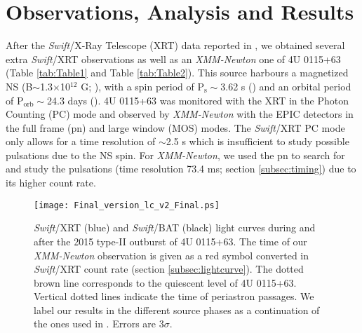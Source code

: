 \documentclass[a4paper,fleqn,usenatbib]{mnras}
\begin{document}
\section{Observations, Analysis and Results}\label{sec:analysis}
After the \textit{Swift}/X-Ray Telescope (XRT) data reported in \cite{Wijnands2016}, we obtained several extra \textit{Swift}/XRT observations as well as an \textit{XMM-Newton} one of 4U 0115+63 (Table \ref{tab:Table1} and Table \ref{tab:Table2}). This source harbours a magnetized NS (B$\sim$1.3$\times$10$^{12}$ G; \citealt{Raguzova2005}), with a spin period of P$_\mathrm{s}\sim$3.62 s (\citealt{Cominsky1978}) and an orbital period of P$_\mathrm{orb}\sim$24.3 days (\citealt{Rappaport1978}). 4U 0115+63 was monitored with the XRT in the Photon Counting (PC) mode and observed by \textit{XMM-Newton} with the EPIC detectors in the full frame (pn) and large window (MOS) modes. The \textit{Swift}/XRT PC mode only allows for a time resolution of $\sim$2.5 s which is insufficient to study possible pulsations due to the NS spin. For \textit{XMM-Newton}, we used the pn to search for and study the pulsations (time resolution 73.4 ms; section \ref{subsec:timing}) due to its higher count rate.\\
\begin{figure}
\centering
\texttt{[image: Final\_version\_lc\_v2\_Final.ps]}
    \caption{\textit{Swift}/XRT (blue) and \textit{Swift}/BAT (black) light curves during and after the 2015 type-II outburst of 4U 0115+63. The time of our \textit{XMM-Newton} observation is given as a red symbol converted in \textit{Swift}/XRT count rate (section \ref{subsec:lightcurve}). The dotted brown line corresponds to the quiescent level of 4U 0115+63. Vertical dotted lines indicate the time of periastron passages. We label our results in the different source phases as a continuation of the ones used in \citet*{Wijnands2016}. Errors are 3$\sigma$.}
   \label{fig:BAT_lc}
\end{figure}
\end{document}
